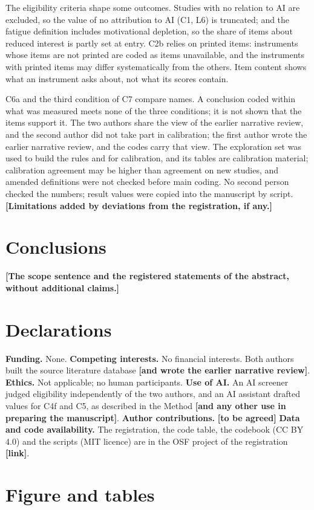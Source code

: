 \documentclass[11pt]{article}
\newcommand{\tbd}[1]{\textbf{[#1]}}
\begin{document}
The eligibility criteria shape some outcomes. Studies with no relation to AI are excluded, so the value of no
attribution to AI (C1, L6) is truncated; and the fatigue definition includes motivational depletion, so the share of
items about reduced interest is partly set at entry. C2b relies on printed items: instruments whose items are not
printed are coded as items unavailable, and the instruments with printed items may differ systematically from the
others. Item content shows what an instrument asks about, not what its scores contain.

C6a and the third condition of C7 compare names. A conclusion coded within what was measured meets none of the three
conditions; it is not shown that the items support it. The two authors share the view of the earlier narrative
review, and the second author did not take part in calibration; the first author wrote the earlier narrative review,
and the codes carry that view. The exploration set was used to
build the rules and for calibration, and its tables are calibration material; calibration agreement may be higher than
agreement on new studies, and amended definitions were not checked before main coding. No second person checked the
numbers; result values were copied into the manuscript by script. \tbd{Limitations added by
deviations from the registration, if any.}

\section{Conclusions}
\tbd{The scope sentence and the registered statements of the abstract, without additional claims.}

\section*{Declarations}
\textbf{Funding.} None.
\textbf{Competing interests.} No financial interests. Both authors built the source literature database \tbd{and wrote
the earlier narrative review}.
\textbf{Ethics.} Not applicable; no human participants.
\textbf{Use of AI.} An AI screener judged eligibility independently of the two authors, and an AI assistant drafted
values for C4f and C5, as described in the Method \tbd{and any other use in preparing the manuscript}.
\textbf{Author contributions.} \tbd{to be agreed}
\textbf{Data and code availability.} The registration, the code table, the codebook (CC BY 4.0) and the scripts (MIT
licence) are in the OSF project of the registration \tbd{link}.

\clearpage
\section*{Figure and tables}


\clearpage


\end{document}
